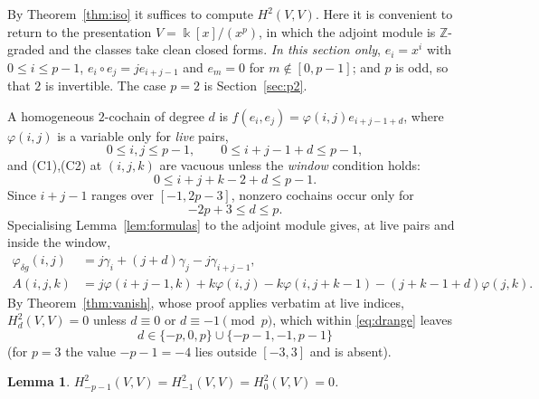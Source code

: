 \documentclass[11pt,reqno]{amsart}
\theoremstyle{plain}
\newtheorem{lemma}[theorem]{Lemma}
\theoremstyle{definition}
\newcommand{\kk}{\Bbbk}
\newcommand{\Ht}{H^2}
\begin{document}
By Theorem~\ref{thm:iso} it suffices to compute $\Ht(V,V)$. Here it is convenient to return
to the presentation $V=\kk[x]/(x^p)$, in which the adjoint module is $\mathbb{Z}$-graded and
the classes take clean closed forms. \emph{In this section only}, $e_i=x^i$ with
$0\le i\le p-1$, $e_i\circ e_j=je_{i+j-1}$ and $e_m=0$ for $m\notin[0,p-1]$; and $p$ is odd,
so that $2$ is invertible. The case $p=2$ is Section~\ref{sec:p2}.

A homogeneous $2$-cochain of degree $d$ is $f(e_i,e_j)=\varphi(i,j)e_{i+j-1+d}$, where
$\varphi(i,j)$ is a variable only for \emph{live} pairs,
\begin{equation}
0\le i,j\le p-1,\qquad 0\le i+j-1+d\le p-1,
\label{eq:live}
\end{equation}
and (C1),(C2) at $(i,j,k)$ are vacuous unless the \emph{window} condition holds:
\begin{equation}
0\le i+j+k-2+d\le p-1 .
\label{eq:window}
\end{equation}
Since $i+j-1$ ranges over $[-1,2p-3]$, nonzero cochains occur only for
\begin{equation}
-2p+3\le d\le p .
\label{eq:drange}
\end{equation}
Specialising Lemma~\ref{lem:formulas} to the adjoint module gives, at live pairs and inside
the window,
\begin{align}
\varphi_{\delta g}(i,j)&=j\gamma_i+(j+d)\gamma_j-j\gamma_{i+j-1},\label{eq:cobV}\\
A(i,j,k)&=j\varphi(i+j-1,k)+k\varphi(i,j)-k\varphi(i,j+k-1)-(j+k-1+d)\varphi(j,k).
\label{eq:C1V}
\end{align}
By Theorem~\ref{thm:vanish}, whose proof applies verbatim at live indices,
$\Ht_d(V,V)=0$ unless $d\equiv0$ or $d\equiv-1 \pmod p$, which within \eqref{eq:drange}
leaves
\begin{equation}
d\in\{-p,0,p\}\cup\{-p-1,-1,p-1\}
\label{eq:six}
\end{equation}
(for $p=3$ the value $-p-1=-4$ lies outside $[-3,3]$ and is absent).

\begin{lemma}\label{lem:zero}
$\Ht_{-p-1}(V,V)=\Ht_{-1}(V,V)=\Ht_{0}(V,V)=0$.
\end{lemma}
\end{document}
